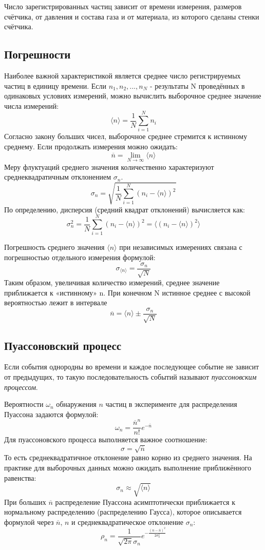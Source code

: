 \documentclass[a4paper]{article}
\begin{document}
Число зарегистрированных частиц зависит от времени измерения, размеров счётчика, от давления и состава газа и от материала, из которого сделаны стенки счётчика.

\subsection{Погрешности}
Наиболее важной характеристикой является среднее число регистрируемых частиц в единицу времени. Если $n_{1}, n_{2}, ..., n_{N}$ - результаты N проведённых в одинаковых условиях измерений, можно вычислить выборочное среднее значение числа измерений:
\[\langle n \rangle = \frac{1}{N}\sum\limits_{i=1}^{N} n_{i}\]
 Согласно закону больших чисел, выборочное среднее стремится к истинному среднему. Если продолжать измерения можно ожидать:
\[\overline{n} = \lim_{N \to \infty} \langle n \rangle\]
Меру флуктуаций среднего значения количественно характеризуют среднеквадратичным отклонением 
$\sigma_{n}$. 
\[
\sigma_n = \sqrt{\frac{1}{N}\sum_{i=1}^{N}(n_i -  \langle n \rangle)^2}
\]
По определению, дисперсия (средний квадрат отклонений) вычисляется как:
\[\sigma_{n}^2 = \frac{1}{N}\sum\limits_{i=1}^{N} (n_{i} - \langle n \rangle)^2 = \langle (n_{i} - \langle n \rangle)^2 \rangle\]

Погрешность среднего значения $\langle n \rangle$ при независимых измерениях связана с погрешностью отдельного измерения формулой:
\[\sigma_{\langle n \rangle} = \frac{\sigma_{n}}{\sqrt{N}}\]
Таким образом, увеличивая количество измерений, среднее значение приближается к «истинному» n. При конечном N истинное среднее с высокой вероятностью лежит в интервале 
\[\overline{n} = \langle n \rangle \pm \frac{\sigma_{n}}{\sqrt{N}}\]

\subsection{Пуассоновский процесс}
Если события однородны во времени и каждое последующее событие не зависит от предыдущих, то такую последовательность событий называют \textit{пуассоновским процессом}.
\newline

Вероятности $\omega_{n}$ обнаружения $n$ частиц в эксперименте для распределения Пуассона задаются формулой:
\[\omega_{n} =  \frac{\overline{n}^{n}}{n!} e^{-\overline{n}}\]
\newline
Для пуассоновского процесса выполняется важное соотношение:
\[\sigma = \sqrt{\overline{n}}\]
То есть среднеквадратичное отклонение равно корню из среднего значения. На практике для выборочных данных можно ожидать выполнение приближённого равенства:
\[\sigma_{n} \approx \sqrt{\langle n \rangle}\]
При больших $\overline{n}$ распределение Пуассона асимптотически приближается к нормальному распределению (распределению Гаусса), которое описывается формулой через $\overline{n}$, $n$ и среднеквадратическое отклонение $\sigma_{n}$:
\[\rho_{n} = \frac{1}{\sqrt{2\pi}\sigma_{n}}e^{-\frac{(n - \overline{n})^2}{2\sigma_{n}^2}}\]
\end{document}
